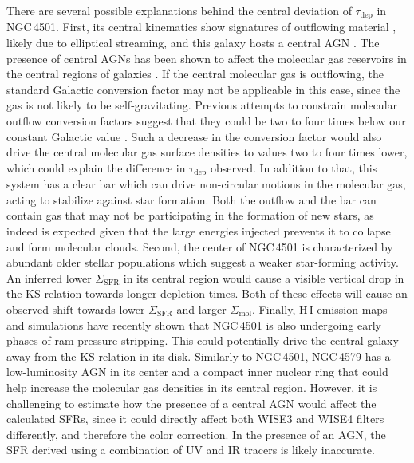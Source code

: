 \documentclass[longauth]{aa}
\begin{document}
There are several possible explanations behind the central deviation of $\tau_\mathrm{dep}$ in NGC\,4501. First, its central kinematics show signatures of outflowing material \citep{Wong2004,Repetto2017}, likely due to
elliptical streaming, and this galaxy hosts a central AGN \citep{Brum2017,Ruschel2021}. The presence of central AGNs has been shown to affect the molecular gas reservoirs in the central regions of galaxies \citep{Ellison2021b,GarciaBurillo2021}. If the central molecular gas is outflowing, the standard Galactic conversion factor may not be applicable in this case, since the gas is not likely to be self-gravitating. Previous attempts to constrain molecular outflow conversion factors suggest that they could be two to four times below our constant Galactic value \citep{Weiss2005,Cicone2012,Cicone2018,Leroy2015,Zschaechner2018,Lutz2020}. Such a decrease in the conversion factor would also drive the central molecular gas surface densities to values two to four times lower, which could explain the difference in $\tau_\mathrm{dep}$ observed. In addition to that, this system has a clear bar which can drive non-circular motions in the molecular gas, acting to stabilize against star formation. Both the outflow and the bar can contain gas that may not be participating in the formation of new stars, as indeed is expected given that the large energies injected prevents it to collapse and form molecular clouds. Second, the center of NGC\,4501 is characterized by abundant older stellar populations which suggest a weaker star-forming activity. An inferred lower $\Sigma_\mathrm{SFR}$ in its central region would cause a visible vertical drop in the KS relation towards longer depletion times. Both of these effects will cause an observed shift towards lower $\Sigma_\mathrm{SFR}$ and larger $\Sigma_\mathrm{mol}$. Finally, H\,I emission maps and simulations \citep{Vollmer2008,Chung2009} have recently shown that NGC\,4501 is also undergoing early phases of ram pressure stripping. This could potentially drive the central galaxy away from the KS relation in its disk. Similarly to NGC\,4501, NGC\,4579 has a low-luminosity AGN in its center \citep{Kuno2007} and a compact inner nuclear ring that could help increase the molecular gas densities in its central region. However, it is challenging to estimate how the presence of a central AGN would affect the calculated SFRs, since it could directly affect both WISE3 and WISE4 filters differently, and therefore the color correction. In the presence of an AGN, the SFR derived using a combination of UV and IR tracers is likely inaccurate.
\end{document}
